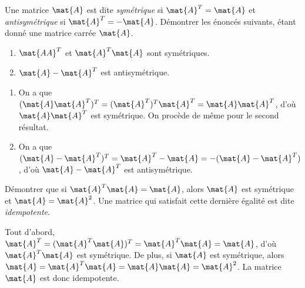 \begin{exercice}
  Une matrice $\mat{A}$ est dite \emph{symétrique} si $\mat{A}^T =
  \mat{A}$ et \emph{antisymétrique} si $\mat{A}^T = - \mat{A}$.
  Démontrer les énoncés suivants, étant donné une matrice carrée
  $\mat{A}$.
  \begin{enumerate}
  \item $\mat{AA}^T$ et $\mat{A}^T\mat{A}$ sont symétriques.
  \item $\mat{A} - \mat{A}^T$ est antisymétrique.
  \end{enumerate}
  \begin{sol}
    \begin{enumerate}
    \item On a que $(\mat{A} \mat{A}^T)^T = (\mat{A}^T)^T \mat{A}^T =
      \mat{A} \mat{A}^T$, d'où $\mat{A} \mat{A}^T$ est symétrique. On
      procède de même pour le second résultat.
    \item On a que $(\mat{A} - \mat{A}^T)^T = \mat{A}^T - \mat{A} =
      -(\mat{A} - \mat{A}^T)$, d'où $\mat{A} - \mat{A}^T$ est
      antisymétrique.
    \end{enumerate}
  \end{sol}
\end{exercice}

\begin{exercice}
  Démontrer que si $\mat{A}^T \mat{A} = \mat{A}$, alors $\mat{A}$
  est symétrique et $\mat{A} = \mat{A}^2$. Une matrice qui satisfait
  cette dernière égalité est dite \emph{idempotente}.
  \begin{sol}
    Tout d'abord, $\mat{A}^T = (\mat{A}^T \mat{A})^T = \mat{A}^T
    \mat{A} = \mat{A}$, d'où $\mat{A}^T \mat{A}$ est symétrique. De
    plus, si $\mat{A}$ est symétrique, alors $\mat{A} = \mat{A}^T
    \mat{A} = \mat{A} \mat{A} = \mat{A}^2$. La matrice $\mat{A}$ est
    donc idempotente.
  \end{sol}
\end{exercice}

